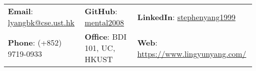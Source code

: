 \documentclass[letterpaper, 11pt]{article}
\begin{document}


\setlength{\tabcolsep}{8pt}


\vspace{0.5cm} 
\begin{center}
\begin{tabular}{lll}
\textbf{Email}: \href{mailto:lyangbk@cse.ust.hk}{\underline{lyangbk@cse.ust.hk}} &
\hspace{0.25in} \textbf{GitHub}: \href{https://github.com/mental2008}{\underline{mental2008}} &
\hspace{0.1in} \textbf{LinkedIn}: \href{https://www.linkedin.com/in/stephenyang1999/}{\underline{stephenyang1999}} \\

\textbf{Phone}: (+852) 9719-0933 &
\hspace{0.25in} \textbf{Office}: BDI 101, UC, HKUST &
\hspace{0.1in} \textbf{Web}: \href{https://www.lingyunyang.com/}{\underline{https://www.lingyunyang.com/}} \\
\end{tabular}
\end{center}
\end{document}
